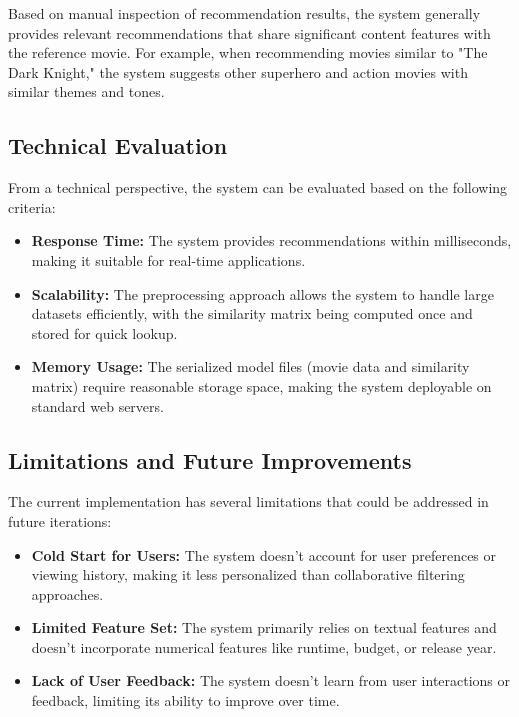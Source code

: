 \documentclass[12pt,a4paper]{article}
\begin{document}
Based on manual inspection of recommendation results, the system generally provides relevant recommendations that share significant content features with the reference movie. For example, when recommending movies similar to "The Dark Knight," the system suggests other superhero and action movies with similar themes and tones.

\subsection{Technical Evaluation}

From a technical perspective, the system can be evaluated based on the following criteria:

\begin{itemize}
    \item \textbf{Response Time:} The system provides recommendations within milliseconds, making it suitable for real-time applications.
    \item \textbf{Scalability:} The preprocessing approach allows the system to handle large datasets efficiently, with the similarity matrix being computed once and stored for quick lookup.
    \item \textbf{Memory Usage:} The serialized model files (movie data and similarity matrix) require reasonable storage space, making the system deployable on standard web servers.
\end{itemize}

\subsection{Limitations and Future Improvements}

The current implementation has several limitations that could be addressed in future iterations:

\begin{itemize}
    \item \textbf{Cold Start for Users:} The system doesn't account for user preferences or viewing history, making it less personalized than collaborative filtering approaches.
    \item \textbf{Limited Feature Set:} The system primarily relies on textual features and doesn't incorporate numerical features like runtime, budget, or release year.
    \item \textbf{Lack of User Feedback:} The system doesn't learn from user interactions or feedback, limiting its ability to improve over time.
\end{itemize}
\end{document}
